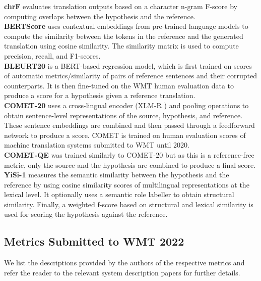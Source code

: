 \documentclass[11pt]{article}
\begin{document}
\noindent \textbf{chrF} \citep{popovic-2017-chrf} evaluates translation outputs based on a character n-gram F-score by computing overlaps between the hypothesis and the reference.\\

\noindent \textbf{BERTScore} \citep{DBLP:conf/iclr/ZhangKWWA20} uses contextual embeddings from pre-trained language models to compute the similarity between the tokens in the reference and the generated translation using cosine similarity. The similarity matrix is used to compute precision, recall, and F1-scores.\\

\noindent \textbf{BLEURT20} \citep{sellam-etal-2020-learning} is a BERT-based \citep{devlin-etal-2019-bert} regression model, which is first trained on  scores of automatic metrics/similarity of pairs of reference sentences and their corrupted counterparts. It is then fine-tuned on the WMT human evaluation data to produce a score for a hypothesis given a reference translation.\\


\noindent \textbf{COMET-20}  \citep{rei-etal-2020-comet} uses a cross-lingual encoder (XLM-R \citep{conneau-etal-2020-unsupervised}) and pooling operations to obtain sentence-level representations of the source, hypothesis, and reference. These sentence embeddings are combined and then passed through a feedforward network to produce a score. \textsc{COMET} is trained on human evaluation scores of machine translation systems submitted to WMT until 2020. \\

\noindent \textbf{COMET-QE} was trained similarly to \textsc{COMET-20} but as this is a reference-free metric, only the source and the hypothesis are combined to produce a final score. \\

\noindent \textbf{YiSi-1} \citep{lo-2019-yisi}
measures the semantic similarity between the hypothesis and the reference by using cosine similarity scores of multilingual representations at the lexical level. It optionally uses a semantic role labeller to obtain structural similarity. Finally, a weighted f-score based on structural and lexical similarity is used for scoring the hypothesis against the reference.

\subsection{Metrics Submitted to WMT 2022}
We list the descriptions provided by the authors of the respective metrics and refer the reader to the relevant system description papers for further details. \\
\end{document}

